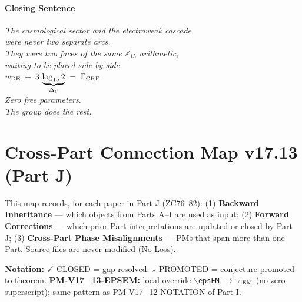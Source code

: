 \documentclass[12pt, a4paper]{article}
\begin{document}
\subsection{Closing Sentence}

\bigskip
\begin{center}
\textit{%
  The cosmological sector and the electroweak cascade\\
  were never two separate arcs.\\[0.3em]
  They were two faces of the same $\mathbb{Z}_{15}$ arithmetic,\\
  waiting to be placed side by side.\\[0.5em]
  $\displaystyle
    w_{\rm DE}
    \;+\;
    3\,\underbrace{\log_{15}2}_{\Delta_\Gamma}
    \;=\;
    \Gamma_{\rm CRF}$\\[0.5em]
  Zero free parameters.\\
  The group does the rest.
}
\end{center}



\newpage
\part{Cross-Part Connection Map v17.13 (Part J)}
\label{part:LII}

\begin{conmapbox}[title={Cross-Part Connection Map v17.13 --- Reading
  Conventions}]
\small
This map records, for each paper in Part J (ZC76--82):
(1) \textbf{Backward Inheritance} — which objects from Parts A–I
are used as input; (2) \textbf{Forward Corrections} — which
prior-Part interpretations are updated or closed by Part J;
(3) \textbf{Cross-Part Phase Misalignments} — PMs that span more
than one Part. Source files are never modified (No-Loss).

\textbf{Notation:}
\textcolor{crfgreen}{$\checkmark$ CLOSED} = gap resolved.
$\star$ PROMOTED = conjecture promoted to theorem.
\textbf{PM-V17\_13-EPSEM:} local override
$\backslash$\texttt{epsEM} $\to$ $\varepsilon_{\rm EM}$ (no
zero superscript); same pattern as PM-V17\_12-NOTATION of Part I.
\end{conmapbox}
\end{document}
